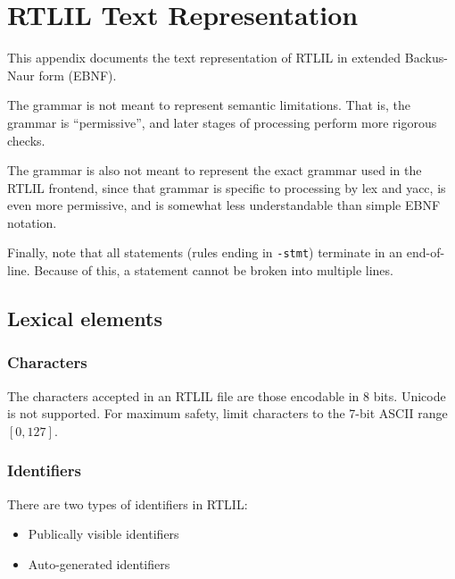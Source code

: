 \chapter{RTLIL Text Representation}
\label{chapter:textrtlil}

\newlength{\myl}

\newenvironment{indentgrammar}[1]
    {\vspace{0.5cm}\hrule
    \setlength{\myl}{\widthof{#1}+2em}
    \grammarindent\the\myl
    \begin{grammar}}
    {\end{grammar}
    \hrule}

This appendix documents the text representation of RTLIL in extended Backus-Naur form (EBNF).

The grammar is not meant to represent semantic limitations. That is, the grammar is ``permissive'', and later stages of processing perform more rigorous checks.

The grammar is also not meant to represent the exact grammar used in the RTLIL frontend, since that grammar is specific to processing by lex and yacc, is even more permissive, and is somewhat less understandable than simple EBNF notation.

Finally, note that all statements (rules ending in \texttt{-stmt}) terminate in an end-of-line. Because of this, a statement cannot be broken into multiple lines.

\section{Lexical elements}

\subsection{Characters}

The characters accepted in an RTLIL file are those encodable in 8 bits. Unicode is not supported. For maximum safety, limit characters to the 7-bit ASCII range $[0,127]$.

\subsection{Identifiers}

There are two types of identifiers in RTLIL:

\begin{itemize}
    \item Publically visible identifiers
    \item Auto-generated identifiers
\end{itemize}

